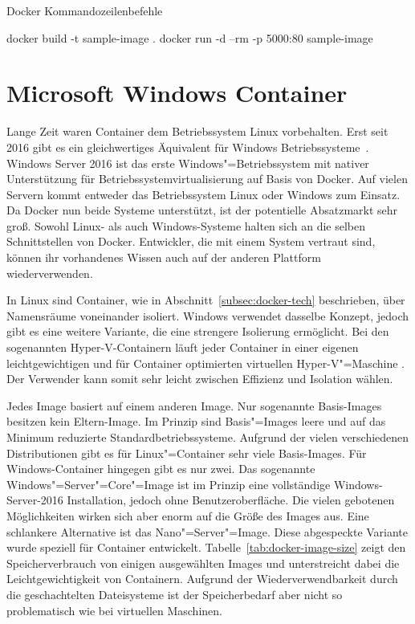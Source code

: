 \begin{program}[!hbt]
\caption{Docker Kommandozeilenbefehle}
\label{prog:dockercommands}
\begin{GenericCode}
docker build -t sample-image .
docker run -d --rm -p 5000:80 sample-image
\end{GenericCode}
\end{program}

\section{Microsoft Windows Container}

Lange Zeit waren Container dem Betriebssystem Linux vorbehalten. Erst seit 2016 gibt es ein gleichwertiges Äquivalent für Windows Betriebssysteme~\cite{WinSerCont}. Windows Server 2016 ist das erste Windows"=Betriebssystem mit nativer Unterstützung für Betriebssystemvirtualisierung auf Basis von Docker. Auf vielen Servern kommt entweder das Betriebssystem Linux oder Windows zum Einsatz. Da Docker nun beide Systeme unterstützt, ist der potentielle Absatzmarkt sehr groß. Sowohl Linux- als auch Windows-Systeme halten sich an die selben Schnittstellen von Docker. Entwickler, die mit einem System vertraut sind, können ihr vorhandenes Wissen auch auf der anderen Plattform wiederverwenden.

In Linux sind Container, wie in Abschnitt~\ref{subsec:docker-tech} beschrieben, über Namensräume voneinander isoliert. Windows verwendet dasselbe Konzept, jedoch gibt es eine weitere Variante, die eine strengere Isolierung ermöglicht. Bei den sogenannten Hyper-V-Containern läuft jeder Container in einer eigenen leichtgewichtigen und für Container optimierten virtuellen Hyper-V"=Maschine \cite{WinConHyperV}. Der Verwender kann somit sehr leicht zwischen Effizienz und Isolation wählen.

Jedes Image basiert auf einem anderen Image. Nur sogenannte Basis-Images besitzen kein Eltern-Image. Im Prinzip sind Basis"=Images leere und auf das Minimum reduzierte Standardbetriebssysteme. Aufgrund der vielen verschiedenen Distributionen gibt es für Linux"=Container sehr viele Basis-Images. Für Windows-Container hingegen gibt es nur zwei. Das sogenannte Windows"=Server"=Core"=Image ist im Prinzip eine vollständige Windows-Server-2016 Installation, jedoch ohne Benutzeroberfläche. Die vielen gebotenen Möglichkeiten wirken sich aber enorm auf die Größe des Images aus. Eine schlankere Alternative ist das Nano"=Server"=Image. Diese abgespeckte Variante wurde speziell für Container entwickelt. Tabelle~\ref{tab:docker-image-size} zeigt den Speicherverbrauch von einigen ausgewählten Images und unterstreicht dabei die Leichtgewichtigkeit von Containern. Aufgrund der Wiederverwendbarkeit durch die geschachtelten Dateisysteme ist der Speicherbedarf aber nicht so problematisch wie bei virtuellen Maschinen.

